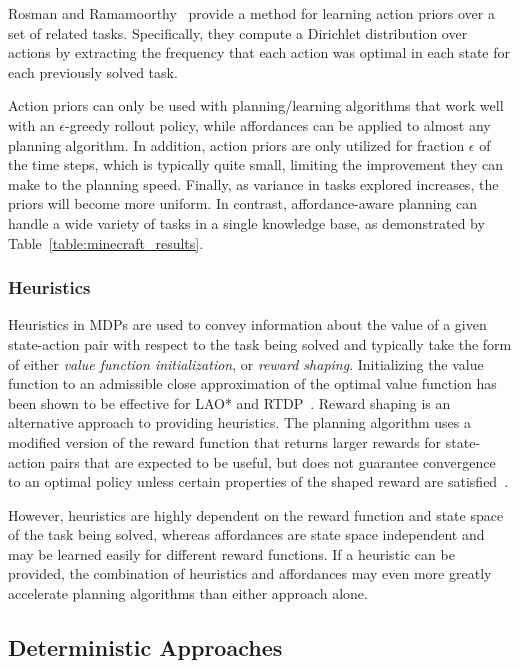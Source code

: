\documentclass[letterpaper]{article}
\begin{document}
Rosman and Ramamoorthy~\cite{rosman2012good} provide a method for learning action
priors over a set of related tasks. Specifically, they compute a Dirichlet distribution over 
actions by extracting the frequency that each action was optimal in each state for each 
previously solved task.

Action priors can only be used with planning/learning algorithms that
work well with an $\epsilon$-greedy rollout policy, while affordances
can be applied to almost any planning algorithm.  In addition, action
priors are only utilized for fraction $\epsilon$ of the time steps,
which is typically quite small, limiting the improvement they can make
to the planning speed.  Finally, as variance in tasks explored
increases, the priors will become more uniform. In contrast,
affordance-aware planning can handle a wide variety of tasks in a
single knowledge base, as demonstrated by
Table~\ref{table:minecraft_results}.

\subsubsection{Heuristics}
Heuristics in MDPs are used to convey information about the value of a
given state-action pair with respect to the task being solved and
typically take the form of either {\em value function initialization},
or {\em reward shaping}. Initializing the value function to an
admissible close approximation of the optimal value function has been
shown to be effective for LAO* and RTDP~\cite{Hansen:1999qf}.  Reward
shaping is an alternative approach to providing heuristics. The
planning algorithm uses a modified version of the reward function that
returns larger rewards for state-action pairs that are expected to be
useful, but does not guarantee convergence to an optimal policy unless
certain properties of the shaped reward are satisfied~\cite{potshap}.

However, heuristics are highly dependent on the reward function and
state space of the task being solved, whereas affordances are state
space independent and may be learned easily for different reward
functions. If a heuristic can be provided, the combination of
heuristics and affordances may even more greatly accelerate planning
algorithms than either approach alone.

\subsection{Deterministic Approaches}
\end{document}
